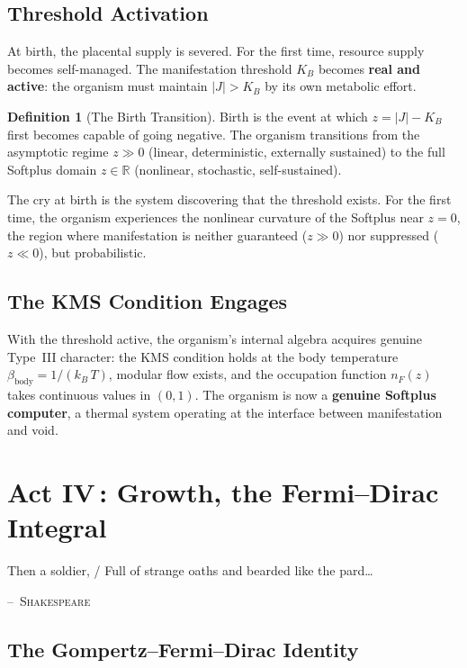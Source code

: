 \documentclass[12pt, letterpaper]{article}
\theoremstyle{plain}
\theoremstyle{definition}
\newtheorem{definition}[theorem]{Definition}
\theoremstyle{remark}
\newcommand{\KB}{K_{\!B}}                 %
\newcommand{\nF}{n_{\!F}}                 %
\newcommand{\Real}{\mathbb{R}}
\begin{document}
\subsection{Threshold Activation}

At birth, the placental supply is severed. For the first time, resource supply becomes self-managed. The manifestation threshold $\KB$ becomes \textbf{real and active}: the organism must maintain $|J| > \KB$ by its own metabolic effort.

\begin{definition}[The Birth Transition]\label{def:birth}
  Birth is the event at which $z = |J| - \KB$ first becomes capable of going negative. The organism transitions from the asymptotic regime $z \gg 0$ (linear, deterministic, externally sustained) to the full Softplus domain $z \in \Real$ (nonlinear, stochastic, self-sustained).
\end{definition}

The cry at birth is the system discovering that the threshold exists. For the first time, the organism experiences the nonlinear curvature of the Softplus near $z = 0$, the region where manifestation is neither guaranteed ($z \gg 0$) nor suppressed ($z \ll 0$), but probabilistic.

\subsection{The KMS Condition Engages}

With the threshold active, the organism's internal algebra acquires genuine Type~III character: the KMS condition holds at the body temperature $\beta_{\text{body}} = 1/(k_{\!B}\,T)$, modular flow exists, and the occupation function $\nF(z)$ takes continuous values in $(0, 1)$. The organism is now a \textbf{genuine Softplus computer}, a thermal system operating at the interface between manifestation and void.


\section{\texorpdfstring{Act IV\,: Growth, the Fermi--Dirac Integral}{Act IV: Growth, the Fermi--Dirac Integral}}
\label{sec:act4}

\epigraph{Then a soldier, / Full of strange oaths and bearded like the pard\ldots}{\textsc{--~Shakespeare}}

\subsection{The Gompertz--Fermi--Dirac Identity}
\end{document}
